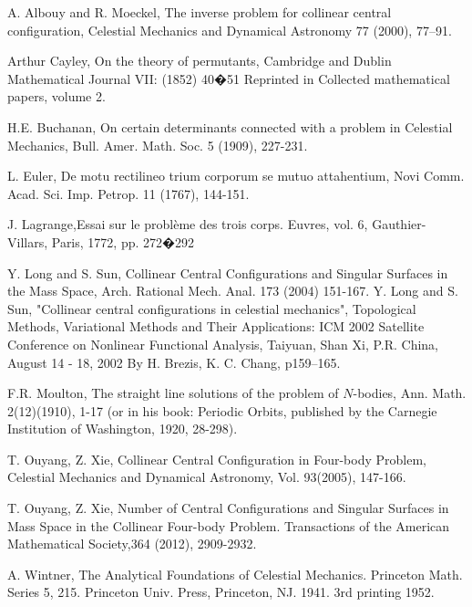 \documentclass[11pt,leqno]{article}
\theoremstyle{definition}
\theoremstyle{remark}
\numberwithin{equation}{section}
\begin{document}

\begin{thebibliography}{00}

 A. Albouy and R. Moeckel, The inverse problem
for collinear central configuration, Celestial Mechanics and
Dynamical Astronomy 77 (2000), 77--91.

 Arthur Cayley, On the theory of permutants, Cambridge and Dublin Mathematical Journal VII:
(1852) 40�51 Reprinted in Collected mathematical papers, volume 2.


 H.E. Buchanan, On certain determinants connected with a problem in Celestial Mechanics, Bull. Amer. Math. Soc. 5 (1909), 227-231.

 L. Euler, De motu rectilineo trium corporum se mutuo attahentium, Novi Comm. Acad. Sci. Imp. Petrop. 11 (1767), 144-151.

 J. Lagrange,Essai sur le probl\`{e}me des trois corps. Euvres, vol. 6, Gauthier-
Villars, Paris, 1772, pp. 272�292 %

 Y. Long and S.  Sun, Collinear Central
Configurations and Singular Surfaces in the Mass Space, Arch.
Rational Mech. Anal. 173 (2004) 151-167.
 Y. Long and S.  Sun, "Collinear central
configurations in celestial mechanics", Topological Methods,
Variational Methods and Their Applications: ICM 2002 Satellite
Conference on Nonlinear Functional Analysis, Taiyuan, Shan Xi, P.R.
China, August 14 - 18, 2002 By H. Brezis, K. C. Chang, p159--165.

 F.R. Moulton, The straight line solutions of the
problem of $N$-bodies, Ann. Math. 2(12)(1910), 1-17 (or in his book:
Periodic Orbits, published by the Carnegie Institution of
Washington, 1920, 28-298).

 T. Ouyang, Z. Xie, Collinear Central Configuration in Four-body Problem,
 Celestial Mechanics and Dynamical Astronomy, Vol. 93(2005),
 147-166.

  T. Ouyang, Z. Xie, Number of Central Configurations and Singular Surfaces in
Mass Space
in the Collinear Four-body Problem. Transactions of the American Mathematical Society,364 (2012), 2909-2932.

 A. Wintner, The Analytical Foundations of Celestial Mechanics. Princeton
Math. Series 5, 215. Princeton Univ. Press, Princeton, NJ. 1941. 3rd
printing 1952.


\end{thebibliography}
\end{document}
